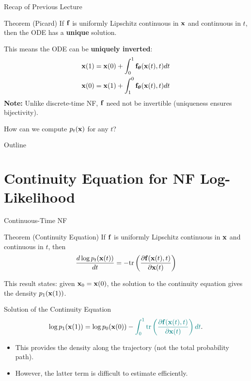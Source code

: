 \documentclass{beamer}
\begin{document}
\begin{frame}{Recap of Previous Lecture}
	\begin{block}{Theorem (Picard)}
		If $\mathbf{f}$ is uniformly Lipschitz continuous in $\mathbf{x}$ and continuous in $t$, then the ODE has a \textbf{unique} solution.
	\end{block}
	This means the ODE can be \textbf{uniquely inverted}:
	\begin{align*}
		\mathbf{x}(1) &= \mathbf{x}(0) + \int_{0}^{1} \mathbf{f}_{\boldsymbol{\theta}}(\mathbf{x}(t), t) dt \\
		\mathbf{x}(0) &= \mathbf{x}(1) + \int_{1}^{0} \mathbf{f}_{\boldsymbol{\theta}}(\mathbf{x}(t), t) dt
	\end{align*}
	\textbf{Note:} Unlike discrete-time NF, $\mathbf{f}$ need not be invertible (uniqueness ensures bijectivity).
	
	How can we compute $p_t(\mathbf{x})$ for any $t$?
\end{frame}
\begin{frame}{Outline}
	\tableofcontents
\end{frame}
\section{Continuity Equation for NF Log-Likelihood}
\begin{frame}{Continuous-Time NF}
	\begin{block}{Theorem (Continuity Equation)}
		If $\mathbf{f}$ is uniformly Lipschitz continuous in $\mathbf{x}$ and continuous in $t$, then
		\[
			\frac{d \log p_t(\mathbf{x}(t))}{d t} = - \text{tr} \left( \frac{\partial \mathbf{f}(\mathbf{x}(t), t)}{\partial \mathbf{x}(t)} \right)
		\]
		\vspace{-0.3cm}
	\end{block}
	\eqpause
	This result states: given $\mathbf{x}_0 = \mathbf{x}(0)$, the solution to the continuity equation gives the density $p_1(\mathbf{x}(1))$.
	\begin{block}{Solution of the Continuity Equation}
		\vspace{-0.3cm}
		\[
			\log p_1(\mathbf{x}(1)) = \log p_0(\mathbf{x}(0)) - {\color{teal}\int_{0}^{1} \text{tr}  \left( \frac{\partial \mathbf{f}(\mathbf{x}(t), t)}{\partial \mathbf{x}(t)} \right) dt}.
		\]
	\end{block}
	\eqpause
	\begin{itemize}
		\item This provides the density along the trajectory (not the total probability path).
		\item However, {\color{teal}the latter term} is difficult to estimate efficiently.
	\end{itemize}
\end{frame}
\end{document}
